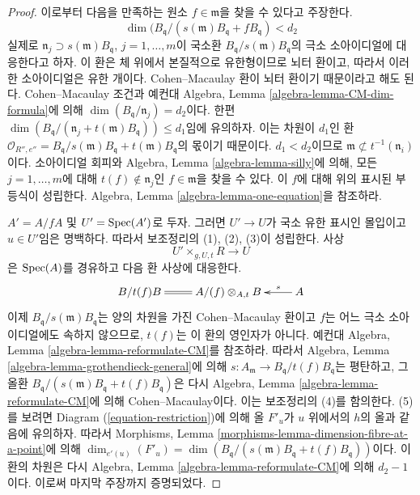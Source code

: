 \begin{proof}
\medskip\noindent
이로부터 다음을 만족하는 원소 $f \in \mathfrak m$을 찾을 수 있다고 주장한다.
$$
\dim(B_{\mathfrak q}/(s(\mathfrak m)B_{\mathfrak q} + fB_{\mathfrak q}) < d_2
$$
실제로 $\mathfrak n_j \supset s(\mathfrak m)B_{\mathfrak q}$,
$j = 1, \ldots, m$이 국소환
$B_{\mathfrak q}/s(\mathfrak m)B_{\mathfrak q}$의 극소 소아이디얼에 대응한다고
하자. 이 환은 체 위에서 본질적으로 유한형이므로 뇌터 환이고, 따라서 이러한
소아이디얼은 유한 개이다. Cohen--Macaulay 환이 뇌터 환이기 때문이라고 해도
된다. Cohen--Macaulay 조건과 예컨대 Algebra, Lemma
\ref{algebra-lemma-CM-dim-formula}에 의해
$\dim(B_{\mathfrak q}/\mathfrak n_j) = d_2$이다. 한편
$\dim(B_{\mathfrak q}/(\mathfrak n_j + t(\mathfrak m)B_{\mathfrak q}))
\leq d_1$임에 유의하자. 이는 차원이 $d_1$인 환
$\mathcal{O}_{R'', e''} =
B_{\mathfrak q}/s(\mathfrak m)B_{\mathfrak q} + t(\mathfrak m)B_{\mathfrak q}$의
몫이기 때문이다. $d_1 < d_2$이므로
$\mathfrak m \not \subset t^{-1}(\mathfrak n_i)$이다. 소아이디얼 회피와
Algebra, Lemma \ref{algebra-lemma-silly}에 의해, 모든
$j = 1, \ldots, m$에 대해 $t(f) \not \in \mathfrak n_j$인
$f \in \mathfrak m$을 찾을 수 있다. 이 $f$에 대해 위의 표시된 부등식이
성립한다. Algebra, Lemma \ref{algebra-lemma-one-equation}을 참조하라.

\medskip\noindent
$A' = A/fA$ 및 $U' = \mathop{\mathrm{Spec}}(A')$로 두자. 그러면 $U' \to U$가
국소 유한 표시인 몰입이고 $u \in U'$임은 명백하다. 따라서 보조정리의
(1), (2), (3)이 성립한다. 사상
$$
U' \times_{g, U, t} R \longrightarrow U
$$
은 $\mathop{\mathrm{Spec}}(A)$를 경유하고 다음 환 사상에 대응한다.
$$
\xymatrix{
B/t(f)B \ar@{=}[r] & A/(f) \otimes_{A, t} B & A \ar[l]_-s
}
$$
이제 $B_{\mathfrak q}/s(\mathfrak m)B_{\mathfrak q}$는 양의 차원을 가진
Cohen--Macaulay 환이고 $f$는 어느 극소 소아이디얼에도 속하지 않으므로,
$t(f)$는 이 환의 영인자가 아니다. 예컨대 Algebra, Lemma
\ref{algebra-lemma-reformulate-CM}를 참조하라. 따라서 Algebra, Lemma
\ref{algebra-lemma-grothendieck-general}에 의해
$s : A_{\mathfrak m} \to B_{\mathfrak q}/t(f)B_{\mathfrak q}$는 평탄하고,
그 올환 $B_{\mathfrak q}/(s(\mathfrak m)B_{\mathfrak q} + t(f)B_{\mathfrak q})$은
다시 Algebra, Lemma \ref{algebra-lemma-reformulate-CM}에 의해
Cohen--Macaulay이다. 이는 보조정리의 (4)를 함의한다. (5)를 보려면
Diagram (\ref{equation-restriction})에 의해 올 $F'_u$가 $u$ 위에서의
$h$의 올과 같음에 유의하자. 따라서 Morphisms, Lemma
\ref{morphisms-lemma-dimension-fibre-at-a-point}에 의해
$\dim_{e'(u)}(F'_u) =
\dim(B_{\mathfrak q}/(s(\mathfrak m)B_{\mathfrak q} + t(f)B_{\mathfrak q}))$이다.
이 환의 차원은 다시 Algebra, Lemma
\ref{algebra-lemma-reformulate-CM}에 의해 $d_2 - 1$이다.
이로써 마지막 주장까지 증명되었다.
\end{proof}

